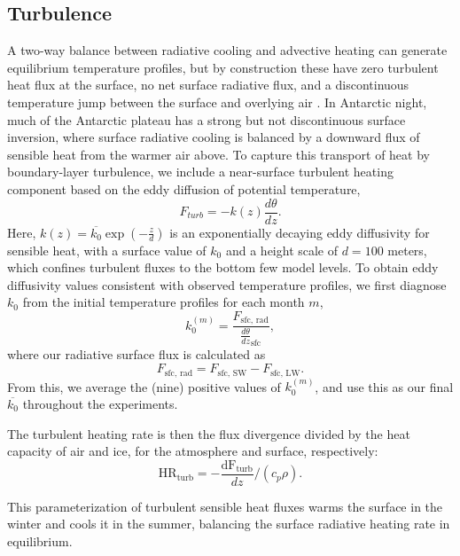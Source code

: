 \documentclass[draft]{agujournal2019}
\begin{document}
\subsection{Turbulence}
A two-way balance between radiative cooling and advective heating can generate equilibrium temperature profiles, but by construction these have zero turbulent heat flux at the surface, no net surface radiative flux, and a discontinuous temperature jump between the surface and overlying air \cite{cronin_analytic_2016}. In Antarctic night, much of the Antarctic plateau has a strong but not discontinuous surface inversion, where surface radiative cooling is balanced by a downward flux of sensible heat from the warmer air above. To capture this transport of heat by boundary-layer turbulence, we include a near-surface turbulent heating component based on the eddy diffusion of potential temperature,
\begin{equation}
    F_{turb} = -k(z) \frac{d\theta}{dz}.
\end{equation}
Here, $k(z) = \overline{k_0} \exp(-\frac{z}{d})$ is an exponentially decaying eddy diffusivity for sensible heat, with a surface value of $k_0$ and a height scale of $d = 100$ meters, which confines turbulent fluxes to the bottom few model levels. To obtain eddy diffusivity values consistent with observed temperature profiles, we first diagnose $k_0$ from the initial temperature profiles for each month $m$,
\begin{equation}
    k_0^{(m)} = \frac{F_{\text{sfc, rad}}}{\frac{d\theta}{dz}_{\text{sfc}}},
\end{equation}
where our radiative surface flux is calculated as
\begin{equation}
    F_{\text{sfc, rad}} = F_{\text{sfc, SW}} - F_{\text{sfc, LW}}.
\end{equation}
From this, we average the (nine) positive values of $k_0^{(m)}$, and use this as our final $\overline{k_0}$ throughout the experiments.

The turbulent heating rate is then the flux divergence divided by the heat capacity of air and ice, for the atmosphere and surface, respectively:
\begin{equation}
    \text{HR}_{\text{turb}} = -\frac{\text{dF}_{\text{turb}}}{dz} /(c_p \rho).
\end{equation}

This parameterization of turbulent sensible heat fluxes warms the surface in the winter and cools it in the summer, balancing the surface radiative heating rate in equilibrium.
\end{document}
